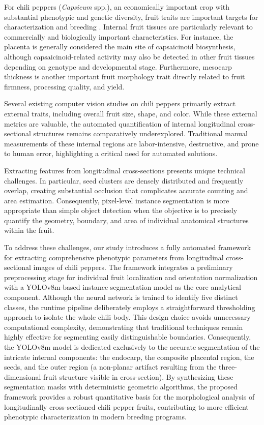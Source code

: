 \documentclass[final,5p,times,twocolumn]{elsarticle}
\begin{document}
For chili peppers (\textit{Capsicum} spp.), an economically important crop with substantial phenotypic and genetic diversity, fruit traits are important targets for characterization and breeding \cite{tripodi}. Internal fruit tissues are particularly relevant to commercially and biologically important characteristics. For instance, the placenta is generally considered the main site of capsaicinoid biosynthesis, although capsaicinoid-related activity may also be detected in other fruit tissues depending on genotype and developmental stage. Furthermore, mesocarp thickness is another important fruit morphology trait directly related to fruit firmness, processing quality, and yield.

Several existing computer vision studies on chili peppers primarily extract external traits, including overall fruit size, shape, and color. While these external metrics are valuable, the automated quantification of internal longitudinal cross-sectional structures remains comparatively underexplored. Traditional manual measurements of these internal regions are labor-intensive, destructive, and prone to human error, highlighting a critical need for automated solutions.

Extracting features from longitudinal cross-sections presents unique technical challenges. In particular, seed clusters are densely distributed and frequently overlap, creating substantial occlusion that complicates accurate counting and area estimation. Consequently, pixel-level instance segmentation is more appropriate than simple object detection when the objective is to precisely quantify the geometry, boundary, and area of individual anatomical structures within the fruit.

To address these challenges, our study introduces a fully automated framework for extracting comprehensive phenotypic parameters from longitudinal cross-sectional images of chili peppers. The framework integrates a preliminary preprocessing stage for individual fruit localization and orientation normalization with a YOLOv8m-based instance segmentation model as the core analytical component. Although the neural network is trained to identify five distinct classes, the runtime pipeline deliberately employs a straightforward thresholding approach to isolate the whole chili body. This design choice avoids unnecessary computational complexity, demonstrating that traditional techniques remain highly effective for segmenting easily distinguishable boundaries. Consequently, the YOLOv8m model is dedicated exclusively to the accurate segmentation of the intricate internal components: the endocarp, the composite placental region, the seeds, and the outer region (a non-planar artifact resulting from the three-dimensional fruit structure visible in cross-section). By synthesizing these segmentation masks with deterministic geometric algorithms, the proposed framework provides a robust quantitative basis for the morphological analysis of longitudinally cross-sectioned chili pepper fruits, contributing to more efficient phenotypic characterization in modern breeding programs.
\end{document}
